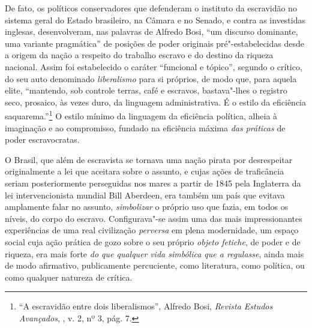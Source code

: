 De fato, os políticos conservadores que defenderam o instituto da
escravidão no sistema geral do Estado brasileiro, na Câmara e no Senado,
e contra as investidas inglesas, desenvolveram, nas palavras de Alfredo
Bosi, ``um discurso dominante, uma variante pragmática'' de posições de
poder originais pré"-estabelecidas desde a origem da nação a respeito do
trabalho escravo e do destino da riqueza nacional. Assim foi
estabelecido o caráter ``funcional e tópico'', segundo o crítico, do seu
auto denominado \emph{liberalismo} para si próprios, de modo que, para
aquela elite, ``mantendo, sob controle terras, café e escravos,
bastava"-lhes o registro seco, prosaico, às vezes duro, da linguagem
administrativa. É o estilo da eficiência saquarema.''\footnote{``A
  escravidão entre dois liberalismos'', Alfredo Bosi, \emph{Revista Estudos
    Avançados}, , v. 2, nº 3, pág. 7.} O estilo mínimo da linguagem da
eficiência política, alheia à imaginação e ao compromisso, fundado na
eficiência máxima \emph{das práticas} de poder escravocratas.

O Brasil, que além de escravista se tornava uma nação pirata por
desrespeitar originalmente a lei que aceitara sobre o assunto, e cujas
ações de traficância seriam posteriormente perseguidas nos mares a
partir de 1845 pela Inglaterra da lei intervencionista mundial Bill
Aberdeen, era também um país que evitava amplamente falar no assunto,
\emph{simbolizar} o próprio uso que fazia, em todos os níveis, do corpo
do escravo. Configurava"-se assim uma das mais impressionantes
experiências de uma real civilização \emph{perversa} em plena
modernidade, um espaço social cuja ação prática de gozo sobre o seu
próprio \emph{objeto fetiche}, de poder e de riqueza, era mais forte
\emph{do que qualquer} \emph{vida simbólica que a regulasse}, ainda mais
de modo afirmativo, publicamente percuciente, como literatura, como
política, ou como qualquer natureza de crítica.

